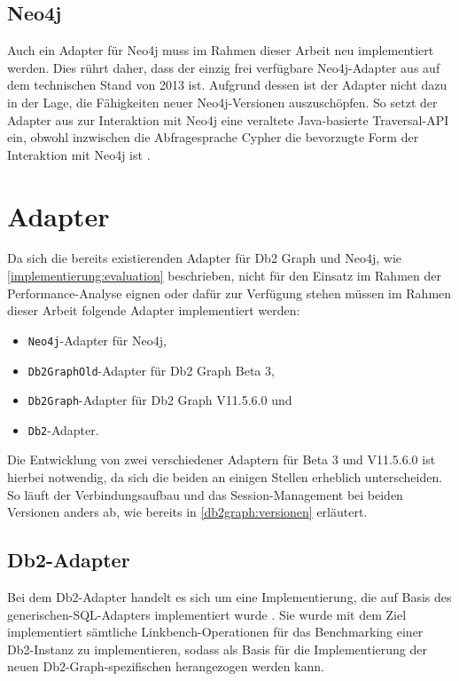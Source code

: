 \subsection{Neo4j}
Auch ein Adapter für Neo4j muss im Rahmen dieser Arbeit neu implementiert werden. Dies rührt daher, dass der einzig frei verfügbare Neo4j-Adapter aus \cite{neo_linkbench_github} auf dem technischen Stand von 2013 ist. Aufgrund dessen ist der Adapter nicht dazu in der Lage, die Fähigkeiten neuer Neo4j-Versionen auszuschöpfen. So setzt der Adapter aus \cite{neo_linkbench_github} zur Interaktion mit Neo4j eine veraltete Java-basierte Traversal-API ein, obwohl inzwischen die Abfragesprache Cypher die bevorzugte Form der Interaktion mit Neo4j ist \cite{gdbms}.

\section{Adapter}
\label{implementierung:adapter}
Da sich die bereits existierenden Adapter für Db2 Graph und Neo4j, wie \autoref{implementierung:evaluation} beschrieben, nicht für den Einsatz im Rahmen der Performance-Analyse eignen oder dafür zur Verfügung stehen müssen im Rahmen dieser Arbeit folgende Adapter implementiert werden:
\begin{itemize}
    \item \texttt{Neo4j}-Adapter für Neo4j,
    \item \texttt{Db2GraphOld}-Adapter für Db2 Graph Beta 3, 
    \item \texttt{Db2Graph}-Adapter für Db2 Graph V11.5.6.0 und
    \item \texttt{Db2}-Adapter.
\end{itemize}
Die Entwicklung von zwei verschiedener Adaptern für Beta 3 und V11.5.6.0 ist hierbei notwendig, da sich die beiden an einigen Stellen erheblich unterscheiden. So läuft der Verbindungsaufbau und das Session-Management bei beiden Versionen anders ab, wie bereits in \autoref{db2graph:versionen} erläutert. 

\subsection{Db2-Adapter}
Bei dem Db2-Adapter handelt es sich um eine Implementierung, die auf Basis des generischen-SQL-Adapters implementiert wurde \cite{mc_linkbench_github}. Sie wurde mit dem Ziel implementiert sämtliche Linkbench-Operationen für das Benchmarking einer Db2-Instanz zu implementieren, sodass als Basis für die Implementierung der neuen Db2-Graph-spezifischen herangezogen werden kann.

